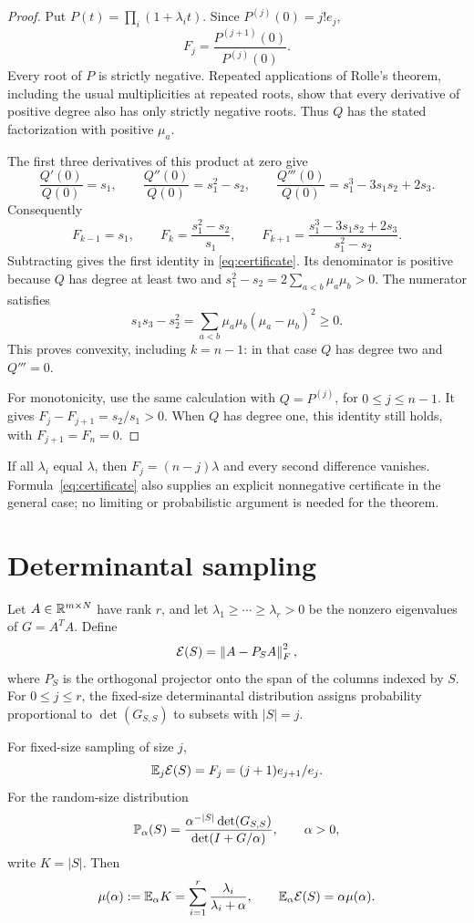 \documentclass[11pt]{article}
\begin{document}
\begin{proof}
Put $P(t)=\prod_i(1+\lambda_i t)$. Since $P^{(j)}(0)=j!e_j$,
\[
 F_j=\frac{P^{(j+1)}(0)}{P^{(j)}(0)}.
\]
Every root of $P$ is strictly negative. Repeated applications of Rolle's theorem, including the usual multiplicities at repeated roots, show that every derivative of positive degree also has only strictly negative roots. Thus $Q$ has the stated factorization with positive $\mu_a$.

The first three derivatives of this product at zero give
\[
 \frac{Q'(0)}{Q(0)}=s_1,\qquad
 \frac{Q''(0)}{Q(0)}=s_1^2-s_2,\qquad
 \frac{Q'''(0)}{Q(0)}=s_1^3-3s_1s_2+2s_3.
\]
Consequently
\[
 F_{k-1}=s_1,\qquad
 F_k=\frac{s_1^2-s_2}{s_1},\qquad
 F_{k+1}=\frac{s_1^3-3s_1s_2+2s_3}{s_1^2-s_2}.
\]
Subtracting gives the first identity in \eqref{eq:certificate}. Its denominator is positive because $Q$ has degree at least two and
$s_1^2-s_2=2\sum_{a<b}\mu_a\mu_b>0$. The numerator satisfies
\[
 s_1s_3-s_2^2=\sum_{a<b}\mu_a\mu_b(\mu_a-\mu_b)^2\ge0.
\]
This proves convexity, including $k=n-1$: in that case $Q$ has degree two and $Q'''=0$.

For monotonicity, use the same calculation with $Q=P^{(j)}$, for $0\le j\le n-1$. It gives $F_j-F_{j+1}=s_2/s_1>0$. When $Q$ has degree one, this identity still holds, with $F_{j+1}=F_n=0$.
\end{proof}

If all $\lambda_i$ equal $\lambda$, then $F_j=(n-j)\lambda$ and every second difference vanishes. Formula~\eqref{eq:certificate} also supplies an explicit nonnegative certificate in the general case; no limiting or probabilistic argument is needed for the theorem.

\section{Determinantal sampling}
Let $A\in\mathbb R^{m\times N}$ have rank $r$, and let $\lambda_1\ge\cdots\ge\lambda_r>0$ be the nonzero eigenvalues of $G=A^TA$. Define
\[
 \mathcal E(S)=\left\lVert A-P_SA\right\rVert_F^2,
\]
where $P_S$ is the orthogonal projector onto the span of the columns indexed by $S$. For $0\le j\le r$, the fixed-size determinantal distribution assigns probability proportional to $\det(G_{S,S})$ to subsets with $|S|=j$.

\begin{lemma}\label{lem:expectations}
For fixed-size sampling of size $j$,
\[
 \mathbb E_j\mathcal E(S)=F_j=(j+1)e_{j+1}/e_j.
\]
For the random-size distribution
\[
 \mathbb P_\alpha(S)=\frac{\alpha^{-|S|}\det(G_{S,S})}{\det(I+G/\alpha)},
 \qquad \alpha>0,
\]
write $K=|S|$. Then
\begin{equation}\label{eq:dpp}
 \mu(\alpha):=\mathbb E_\alpha K=\sum_{i=1}^r\frac{\lambda_i}{\lambda_i+\alpha},
 \qquad \mathbb E_\alpha\mathcal E(S)=\alpha\mu(\alpha).
\end{equation}
\end{lemma}
\end{document}
